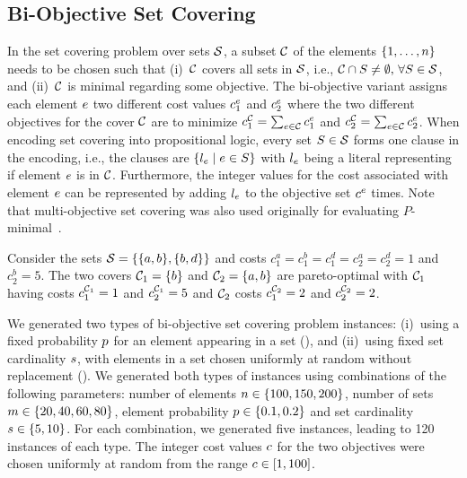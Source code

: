 \subsection{Bi-Objective Set Covering}

In the set covering problem over sets $\mathcal{S}$, a subset $\mathcal{C}$ of the elements $\{1,\dots,n\}$ needs to be chosen such that (i)~$\mathcal{C}$ covers all sets in $\mathcal{S}$, i.e., $\mathcal{C}\cap S\neq\emptyset,\,\forall S\in\mathcal{S}$, and (ii)~$\mathcal{C}$ is minimal regarding some objective.
The bi-objective variant assigns each element $e$ two different cost values $c^e_1$ and $c^e_2$ where the two different objectives for the cover $\mathcal{C}$ are to minimize $c^{\mathcal{C}}_1 = \sum_{e\in\mathcal{C}}c^e_1$ and $c^{\mathcal{C}}_2 = \sum_{e\in\mathcal{C}}c^e_2$.
When encoding set covering into propositional logic, every set $S\in\mathcal{S}$ forms one clause in the encoding, i.e., the clauses are $\{l_e \mid e\in S\}$ with $l_e$ being a literal representing if element $e$ is in $\mathcal{C}$.
Furthermore, the integer values for the cost associated with element $e$ can be represented by adding $l_e$ to the objective set $c^e$ times.
Note that multi-objective set covering was also used originally for evaluating $P$-minimal~\autocite{DBLP:conf/cp/SohBTB17}.

\begin{example}
  Consider the sets $\mathcal{S} = \{ \{a, b\}, \{b, d\} \}$ and costs $c^a_1 = c^b_1 = c^d_1 = c^a_2 = c^d_2 = 1$ and $c^b_2 = 5$.
  The two covers $\mathcal{C}_1 = \{ b \}$ and $\mathcal{C}_2 = \{ a, b \}$ are pareto-optimal with $\mathcal{C}_1$ having costs $c^{\mathcal{C}_1}_1 = 1$ and $c^{\mathcal{C}_1}_2 = 5$ and $\mathcal{C}_2$ costs $c^{\mathcal{C}_2}_1 = 2$ and $c^{\mathcal{C}_2}_2 = 2$.
\end{example}

We generated two types of  bi-objective set covering problem instances:
(i)~using a fixed probability $p$ for an element appearing in a set (\scep{}), and (ii)~using fixed set cardinality $s$, with elements in a set chosen uniformly at random without replacement (\scsc{}).
We generated both types of instances using combinations of the following parameters:
number of elements $n\in\{100,150,200\}$, number of sets $m\in\{20,40,60,80\}$, element probability $p\in\{0.1,0.2\}$ and set cardinality $s\in\{5,10\}$.
For each combination, we generated five instances, leading to 120 instances of each type.
The integer cost values $c$ for the two objectives were chosen uniformly at random from the range $c\in[1,100]$.

